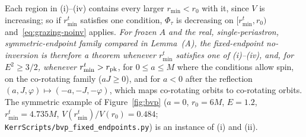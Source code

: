 \documentclass[12pt]{iopart}
\theoremstyle{plain}
\theoremstyle{definition}
\theoremstyle{remark}
\begin{document}
Each region in (i)--(iv) contains every larger $r_{\min}<r_0$ with it, since $V$ is
increasing; so if $r_{\min}^t$ satisfies one condition, $\Phi_\tau$ is decreasing on
$[r_{\min}^t,r_0)$ and~\eqref{eq:grazing-noinv} applies. \emph{For frozen $A$ and the
real, single-periastron, symmetric-endpoint family compared in Lemma~(A), the
fixed-endpoint no-inversion is therefore a theorem whenever $r_{\min}^t$ satisfies one of (i)--(iv), and,
for $E^2\ge3/2$, whenever $r_{\min}^t>r_{\rm pk}$}, for $0\le a\le M$ where the conditions allow spin,
on the co-rotating family ($aJ\ge0$), and for $a<0$ after the reflection
$(a,J,\varphi)\mapsto(-a,-J,-\varphi)$, which maps co-rotating orbits to co-rotating orbits. The symmetric example of Figure~\ref{fig:bvp} ($a=0$, $r_0=6M$, $E=1.2$,
$r_{\min}^t=4.735M$, $V(r_{\min}^t)/V(r_0)=0.484$; \texttt{KerrScripts/bvp\_fixed\_endpoints.py})
is an instance of (i) and (ii).
\end{document}
